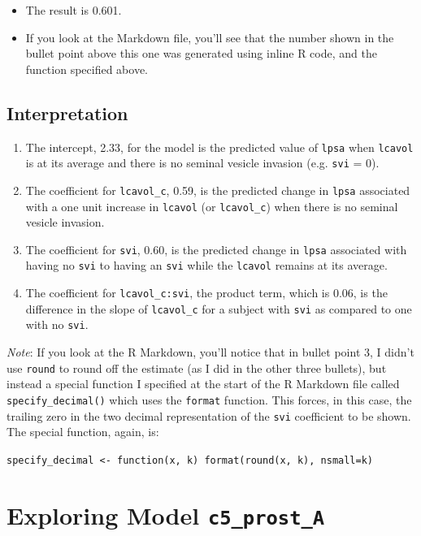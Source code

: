 \documentclass[]{book}
\providecommand{\tightlist}{%
  \setlength{\itemsep}{0pt}\setlength{\parskip}{0pt}}
\theoremstyle{definition}
\theoremstyle{definition}
\theoremstyle{definition}
\theoremstyle{remark}
\begin{document}
\begin{itemize}
\tightlist
\item
  The result is 0.601.
\item
  If you look at the Markdown file, you'll see that the number shown in
  the bullet point above this one was generated using inline R code, and
  the function specified above.
\end{itemize}

\subsection{Interpretation}\label{interpretation}

\begin{enumerate}
\def\labelenumi{\arabic{enumi}.}
\tightlist
\item
  The intercept, 2.33, for the model is the predicted value of
  \texttt{lpsa} when \texttt{lcavol} is at its average and there is no
  seminal vesicle invasion (e.g. \texttt{svi} = 0).
\item
  The coefficient for \texttt{lcavol\_c}, 0.59, is the predicted change
  in \texttt{lpsa} associated with a one unit increase in
  \texttt{lcavol} (or \texttt{lcavol\_c}) when there is no seminal
  vesicle invasion.
\item
  The coefficient for \texttt{svi}, 0.60, is the predicted change in
  \texttt{lpsa} associated with having no \texttt{svi} to having an
  \texttt{svi} while the \texttt{lcavol} remains at its average.
\item
  The coefficient for \texttt{lcavol\_c:svi}, the product term, which is
  0.06, is the difference in the slope of \texttt{lcavol\_c} for a
  subject with \texttt{svi} as compared to one with no \texttt{svi}.
\end{enumerate}

\emph{Note}: If you look at the R Markdown, you'll notice that in bullet
point 3, I didn't use \texttt{round} to round off the estimate (as I did
in the other three bullets), but instead a special function I specified
at the start of the R Markdown file called \texttt{specify\_decimal()}
which uses the \texttt{format} function. This forces, in this case, the
trailing zero in the two decimal representation of the \texttt{svi}
coefficient to be shown. The special function, again, is:

\texttt{specify\_decimal\ \textless{}-\ function(x,\ k)\ format(round(x,\ k),\ nsmall=k)}

\section{\texorpdfstring{Exploring Model
\texttt{c5\_prost\_A}}{Exploring Model c5\_prost\_A}}\label{exploring-model-c5_prost_a}
\end{document}
